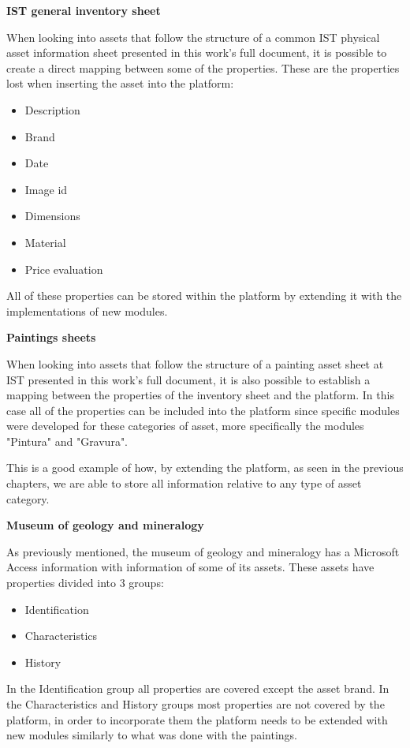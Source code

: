 \vspace{4mm}
\textbf{IST general inventory sheet}
\vspace{2mm}

When looking into assets that follow the structure of a common IST physical asset information sheet presented in this work's full document, it is possible to create a direct mapping between some of the properties. These are the properties lost when inserting the asset into the platform:

\begin{multicols}{2}
\begin{itemize}
    \item Description
    \item Brand
    \item Date
    \item Image id
    \item Dimensions
    \item Material
    \item Price evaluation
\end{itemize}
\end{multicols}

All of these properties can be stored within the platform by extending it with the implementations of new modules.

\vspace{4mm}
\textbf{Paintings sheets}
\vspace{2mm}

When looking into assets that follow the structure of a painting asset sheet at IST presented in this work's full document, it is also possible to establish a mapping between the properties of the inventory sheet and the platform. In this case all of the properties can be included into the platform since specific modules were developed for these categories of asset, more specifically the modules "Pintura" and "Gravura".

This is a good example of how, by extending the platform, as seen in the previous chapters, we are able to store all information relative to any type of asset category.

\vspace{4mm}
\textbf{Museum of geology and mineralogy}
\vspace{2mm}

As previously mentioned, the museum of geology and mineralogy has a Microsoft Access information with information of some of its assets. These assets have properties divided into 3 groups:

\begin{itemize}
    \item Identification
    \item Characteristics
    \item History
\end{itemize}

In the Identification group all properties are covered except the asset brand.
In the Characteristics and History groups most properties are not covered by the platform, in order to incorporate them the platform needs to be extended with new modules similarly to what was done with the paintings.
